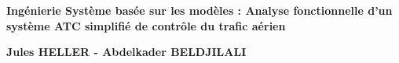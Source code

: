 
\begin{titlepage}
	\parindent=0pt
 
\addtolength{\wpXoffset}{-4.5cm}

	
	\hrulefill
	\begin{center}\bfseries\Huge
		\color{white}
		{Ingénierie Système basée sur les modèles : Analyse fonctionnelle d'un système ATC simplifié de contrôle du trafic aérien} 
	\end{center}
	\hrulefill
	
	\vspace*{1cm}
	\begin{center}\bfseries\Large
			\color{white}
		{Jules HELLER - Abdelkader BELDJILALI}
		
	\end{center}
	


\end{titlepage}
